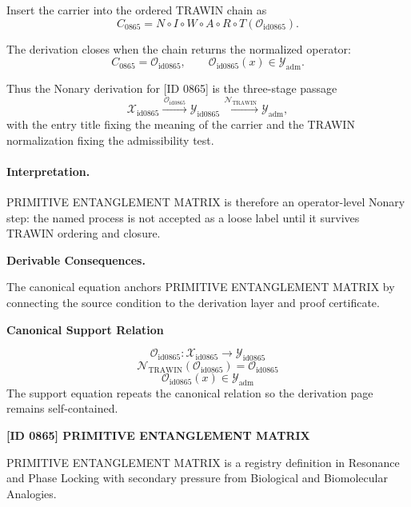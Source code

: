 Insert the carrier into the ordered TRAWIN chain as\[
C_{0865}=N\circ I\circ W\circ A\circ R\circ T(\mathcal{O}_{\mathrm{id0865}}).
\]

The derivation closes when the chain returns the normalized operator:\[
C_{0865}=\mathcal{O}_{\mathrm{id0865}},\qquad \mathcal{O}_{\mathrm{id0865}}(x)\in\mathcal{Y}_{\mathrm{adm}}.
\]

Thus the Nonary derivation for [ID 0865] is the three-stage passage
\[
\mathcal{X}_{\mathrm{id0865}}\xrightarrow{\,\mathcal{O}_{\mathrm{id0865}}\,} \mathcal{Y}_{\mathrm{id0865}}\xrightarrow{\,\mathcal{N}_{\mathrm{TRAWIN}}\,} \mathcal{Y}_{\mathrm{adm}},
\]
with the entry title fixing the meaning of the carrier and the TRAWIN normalization fixing the admissibility test.

\paragraph{Interpretation.} PRIMITIVE ENTANGLEMENT MATRIX is therefore an operator-level Nonary step: the named process is not accepted as a loose label until it survives TRAWIN ordering and closure.

\par\vspace{0.35em}
\noindent\textbf{Derivable Consequences.}\quad
\begingroup
\footnotesize
\raggedright
The canonical equation anchors PRIMITIVE ENTANGLEMENT MATRIX by connecting the source condition to the derivation layer and proof certificate.
\par\endgroup

\noindent\textbf{Canonical Support Relation}\par
\[
\mathcal{O}_{\mathrm{id0865}}:\mathcal{X}_{\mathrm{id0865}}\longrightarrow\mathcal{Y}_{\mathrm{id0865}}
\]
\[
\mathcal{N}_{\mathrm{TRAWIN}}(\mathcal{O}_{\mathrm{id0865}})=\mathcal{O}_{\mathrm{id0865}}
\]
\[
\mathcal{O}_{\mathrm{id0865}}(x)\in\mathcal{Y}_{\mathrm{adm}}
\]
\noindent The support equation repeats the canonical relation so the derivation page remains self-contained.\par

\clearpage
\noindent\textbf{[ID 0865] PRIMITIVE ENTANGLEMENT MATRIX}\par
\vspace{0.35em}
\begingroup\small
{}
PRIMITIVE ENTANGLEMENT MATRIX is a registry definition in Resonance and Phase Locking with secondary pressure from Biological and Biomolecular Analogies.

